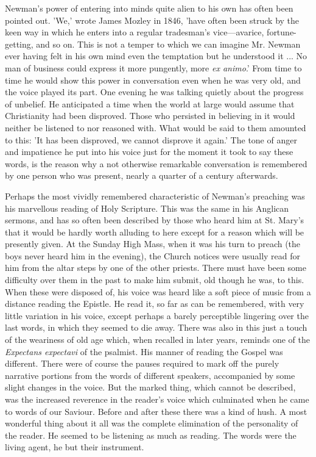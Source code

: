 Newman's power of entering into minds quite alien
to his own has often been pointed out. 'We,' wrote James Mozley in
1846, 'have often been struck by the keen way in which he enters into
a regular tradesman's vice—avarice, fortune-getting, and so on. This
is not a temper to which we can imagine Mr. Newman ever having felt in
his own mind even the temptation but he understood it ... No man of
business could express it more pungently, more \emph{ex animo}.' From
time to time he would show this power in conversation even when he was
very old, and the voice played its part. One evening he was talking
quietly about the progress of unbelief. He anticipated a time when the
world at large would assume that Christianity had been disproved.
Those who persisted in believing in it would neither be listened to
nor reasoned with. What would be said to them amounted to this: 'It
has been disproved, we cannot disprove it again.' The tone of anger
and impatience he put into his voice just for the moment it took to
say these words, is the reason why a not otherwise remarkable
conversation is remembered by one person who was present, nearly a
quarter of a century afterwards.

Perhaps the most vividly remembered
characteristic of Newman's preaching was his marvellous reading of
Holy Scripture. This was the same in his Anglican sermons, and has so
often been described by those who heard him at St. Mary's that it
would be hardly worth alluding to here except for a reason which will
be presently given. At the Sunday High Mass, when it was his turn to
preach (the boys never heard him in the evening), the Church notices
were usually read for him from the altar steps by one of the other
priests. There must have been some difficulty over them in the past to
make him submit, old though he was, to this. When these were disposed
of, his voice was heard like a soft piece of music from a distance
reading the Epistle. He read it, so far as can be remembered, with
very little variation in his voice, except perhaps a barely
perceptible lingering over the last words, in which they seemed to die
away. There was also in this just a touch of the weariness of old age
which, when recalled in later years, reminds one of the \emph{Expectans
expectavi} of the psalmist. His manner of reading the Gospel was
different. There were of course the pauses required to mark off the
purely narrative portions from the words of different speakers,
accompanied by some slight changes in the voice. But the marked thing,
which cannot be described, was the increased reverence in the reader's
voice which culminated when he came to words of our Saviour.
Before and after these there was a kind of hush. A most wonderful
thing about it all was the complete elimination of the personality of
the reader. He seemed to be listening as much as reading. The words
were the living agent, he but their instrument.

